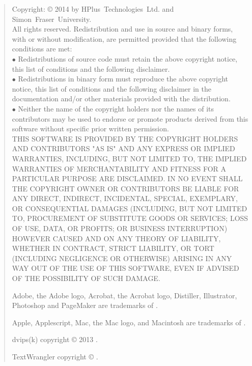\begin{quote}
\begin{small}
Copyright: \copyright{} 2014 by HPlus~Technologies~Ltd. and Simon~Fraser~University.
\\
All rights reserved. Redistribution and use in source and binary forms, with or without
modification, are permitted provided that the following conditions are met:\\
$\bullet$ Redistributions of source code must retain the above copyright notice, this list
of conditions and the following disclaimer.\\
$\bullet$ Redistributions in binary form must reproduce the above copyright notice, this
list of conditions and the following disclaimer in the documentation and/or other
materials provided with the distribution.\\
$\bullet$ Neither the name of the copyright holders nor the names of its contributors may
be used to endorse or promote products derived from this software without specific prior
written permission.\\
THIS SOFTWARE IS PROVIDED BY THE COPYRIGHT HOLDERS AND CONTRIBUTORS "AS IS" AND ANY
EXPRESS OR IMPLIED WARRANTIES, INCLUDING, BUT NOT LIMITED TO, THE IMPLIED WARRANTIES OF
MERCHANTABILITY AND FITNESS FOR A PARTICULAR PURPOSE ARE DISCLAIMED.
IN NO EVENT SHALL THE COPYRIGHT OWNER OR CONTRIBUTORS BE LIABLE FOR ANY DIRECT, INDIRECT,
INCIDENTAL, SPECIAL, EXEMPLARY, OR CONSEQUENTIAL DAMAGES (INCLUDING, BUT NOT LIMITED TO,
PROCUREMENT OF SUBSTITUTE GOODS OR SERVICES; LOSS OF USE, DATA, OR PROFITS; OR BUSINESS
INTERRUPTION) HOWEVER CAUSED AND ON ANY THEORY OF LIABILITY, WHETHER IN CONTRACT, STRICT
LIABILITY, OR TORT (INCLUDING NEGLIGENCE OR OTHERWISE) ARISING IN ANY WAY OUT OF THE USE
OF THIS SOFTWARE, EVEN IF ADVISED OF THE POSSIBILITY OF SUCH DAMAGE.

Adobe, the Adobe logo, Acrobat, the Acrobat logo, Distiller, Illustrator, Photoshop and
PageMaker are trademarks of
.

Apple, Applescript, Mac, the Mac logo, and Macintosh are trademarks of
.

dvips(k) copyright \copyright{} 2013
.

TextWrangler copyright \copyright{}
.


\end{small}
\end{quote}
